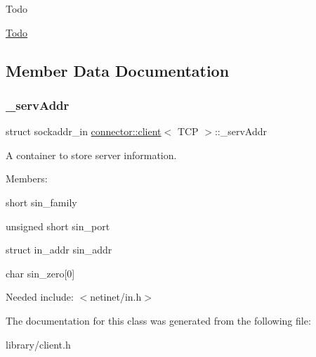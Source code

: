 \begin{DoxyRefDesc}{Todo}
\item[\hyperlink{todo__todo000005}{Todo}]\end{DoxyRefDesc}


\subsection{Member Data Documentation}
\mbox{\label{classconnector_1_1client_3_01TCP_01_4_af68017a9141be44f9722c6958c6424fc}} 
\subsubsection{\texorpdfstring{\+\_\+serv\+Addr}{\_servAddr}}
{\footnotesize\ttfamily struct sockaddr\+\_\+in \hyperlink{classconnector_1_1client}{connector\+::client}$<$ T\+CP $>$\+::\+\_\+serv\+Addr\hspace{0.3cm}{\ttfamily [private]}}



A container to store server information. 

Members\+:
\begin{DoxyItemize}
\item {\ttfamily short} sin\+\_\+family
\item {\ttfamily unsigned short} sin\+\_\+port
\item {\ttfamily struct} in\+\_\+addr sin\+\_\+addr
\item {\ttfamily char} sin\+\_\+zero\mbox{[}0\mbox{]}
\end{DoxyItemize}

Needed include\+: {\ttfamily $<$netinet/in.\+h$>$} 

The documentation for this class was generated from the following file\+:\begin{DoxyCompactItemize}
\item 
library/client.\+h\end{DoxyCompactItemize}

